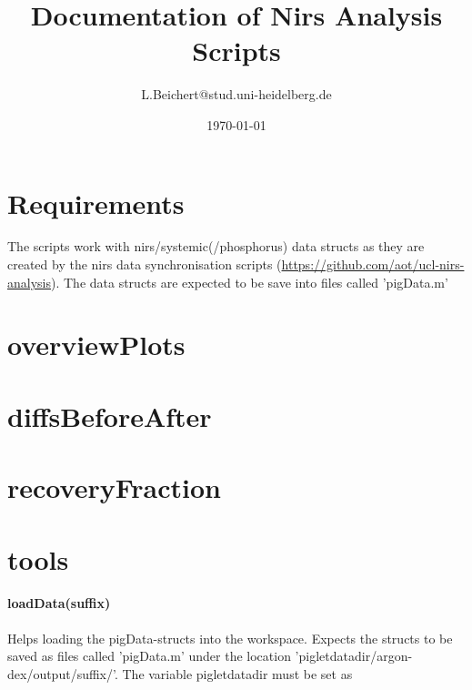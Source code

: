 \documentclass[11pt, a4paper]{article}
\title{Documentation of Nirs Analysis Scripts}
\author{L.Beichert@stud.uni-heidelberg.de}
\date{\today}
\begin{document}
\maketitle

\section{Requirements}
The scripts work with nirs/systemic(/phosphorus) data structs as they are created by the nirs data synchronisation scripts (\url{https://github.com/aot/ucl-nirs-analysis}).
The data structs are expected to be save into files called 'pigData.m'

\section{overviewPlots}

\section{diffsBeforeAfter}

\section{recoveryFraction}

\section{tools}
\paragraph{loadData(suffix)}
Helps loading the pigData-structs into the workspace. Expects the structs to be saved as files called 'pigData.m' under the location 'pigletdatadir/argon-dex/output/suffix/'. The variable pigletdatadir must be set as 
\end{document}
